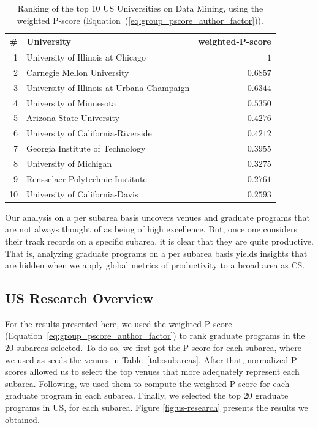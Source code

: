 \documentclass[msc]{ppgccufmg}
\begin{document}
\begin{table}[htbp]
\centering
\caption{Ranking of the top 10 US Universities on Data Mining, using the weighted P-score (Equation~(\ref{eq:group_pscore_author_factor})).}
\label{tab:top10-dm}
\begin{tabular}{rlr}
    \toprule
    \# & University                                 & \multicolumn{1}{c}{weighted-P-score} \\
    \midrule
    1    & University of Illinois at Chicago                & $1$        \\
    2    & Carnegie Mellon University                    & $0.6857$    \\
    3    & University of Illinois at Urbana-Champaign    & $0.6344$    \\
    4    & University of Minnesota                        & $0.5350$    \\
    5    & Arizona State University                        & $0.4276$    \\
    6    & University of California-Riverside            & $0.4212$    \\
    7    & Georgia Institute of Technology                & $0.3955$    \\
    8    & University of Michigan                        & $0.3275$    \\
    9    & Rensselaer Polytechnic Institute                & $0.2761$    \\
    10    & University of California-Davis                & $0.2593$    \\
    \bottomrule
\end{tabular}
\end{table}

Our analysis on a per subarea basis uncovers venues and graduate programs that are not always thought of as being of high excellence. But, once one considers their track records on a specific subarea, it is clear that they are quite productive. That is, analyzing graduate programs on a per subarea basis yields insights that are hidden when we apply global metrics of productivity to a broad area as CS.

\subsection*{US Research Overview}

For the results presented here, we used the weighted P-score (Equation~\ref{eq:group_pscore_author_factor}) to rank graduate programs in the 20 subareas selected. To do so, we first got the P-score for each subarea, where we used as seeds the venues in Table~\ref{tab:subareas}. After that, normalized P-scores allowed us to select the top venues that more adequately represent each subarea. Following, we used them to compute the weighted P-score for each graduate program in each subarea. Finally, we selected the top 20 graduate programs in US, for each subarea. Figure \ref{fig:us-research} presents the results we obtained.
\end{document}
